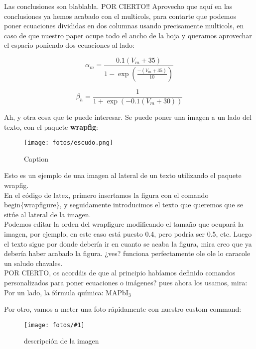 \documentclass[12pt,a4paper]{article}
\newcommand{\MA}{MAPbI$_3$}
\newcommand{\NEWPIC}[3]{
\begin{figure}[H]
    \centering
    \texttt{[image: fotos/\#1]}
    \caption{#3}
    \label{#1}
    \end{figure}
    }
\begin{document}
Las conclusiones son blablabla. POR CIERTO!! Aprovecho que aquí en las conclusiones ya hemos acabado con el multicols, para contarte que podemos poner ecuaciones divididas en dos columnas usando precisamente multicols, en caso de que nuestro paper ocupe todo el ancho de la hoja y queramos aprovechar el espacio poniendo dos ecuaciones al lado:

\begin{multicols}{2}
\begin{equation}
    \alpha_{m}=\frac{0.1(V_{m}+35)}{1-\exp(\frac{-(V_{m}+35)}{10})}
    \label{ec:alpha_m}
\end{equation}

\begin{equation}
    \beta_{h}=\frac{1}{1+\exp(-0.1(V_{m}+30))}
    \label{ec:beta_h}
\end{equation}
\end{multicols}

Ah, y otra cosa que te puede interesar. Se puede poner una imagen a un lado del texto, con el paquete \textbf{wrapfig}:

\begin{wrapfigure}{l}{0.3\textwidth}
\centering
\texttt{[image: fotos/escudo.png]}
\caption{Caption}
\end{wrapfigure}

Esto es un ejemplo de una imagen al lateral de un texto utilizando el paquete wrapfig.\\
En el código de latex, primero insertamos la figura con el comando begin\{wrapfigure\}, y seguidamente introducimos el texto que queremos que se sitúe al lateral de la imagen.\\
Podemos editar la orden del wrapfigure modificando el tamaño que ocupará la imagen, por ejemplo, en este caso está puesto 0.4, pero podría ser 0.5, etc. Luego el texto sigue por donde debería ir en cuanto se acaba la figura, mira creo que ya debería haber acabado la figura. ¿ves? funciona perfectamente ole ole lo caracole un saludo chavales.\\[0.5cm]
POR CIERTO, os acordáis de que al principio habíamos definido comandos personalizados para poner ecuaciones o imágenes? pues ahora los usamos, mira:\\

Por un lado, la fórmula química: {\MA}

Por otro, vamos a meter una foto rápidamente con nuestro custom command:

\NEWPIC{escudo}{0.4}{descripción de la imagen}
\end{document}
